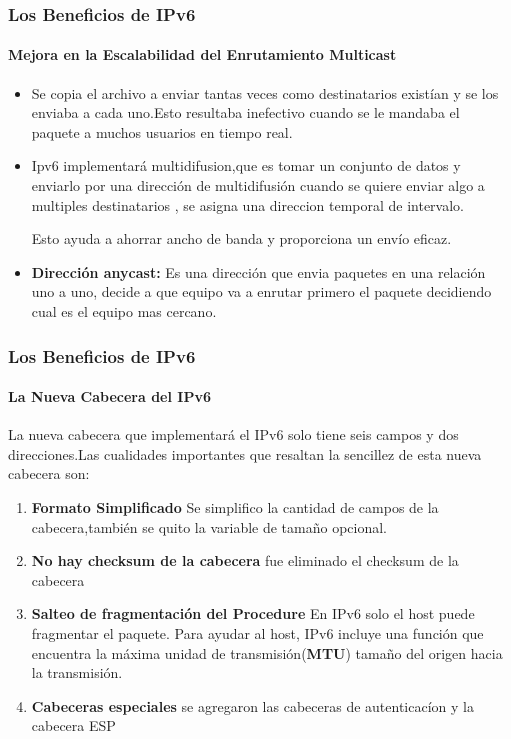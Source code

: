 \documentclass{beamer}
\begin{document}
\begin{frame}
\frametitle{Los Beneficios de IPv6}
\framesubtitle{Mejora en la Escalabilidad del Enrutamiento Multicast}
\begin{itemize}
\item Se copia  el archivo a enviar tantas 
veces como destinatarios existían y se los enviaba a cada uno.Esto resultaba inefectivo cuando se le mandaba el paquete a muchos usuarios en tiempo real.\par
\item Ipv6 implementará multidifusion,que es tomar  un conjunto de datos y enviarlo por una dirección de multidifusión
cuando se quiere enviar algo a multiples destinatarios , se asigna una direccion temporal de intervalo.\par
Esto ayuda a ahorrar ancho de banda y proporciona un envío eficaz.
\item  \textbf{Dirección anycast:} Es una dirección que envia paquetes en una relación uno a uno, decide a que equipo va a enrutar primero el paquete decidiendo cual es el equipo mas cercano.
 \end{itemize}
\end{frame}


\begin{frame}
\frametitle{Los Beneficios de IPv6}
\framesubtitle{La Nueva Cabecera del IPv6}
La nueva cabecera que implementará el IPv6 solo tiene seis campos y dos direcciones.Las cualidades importantes que resaltan la sencillez de esta nueva cabecera son:
 \begin{enumerate}
\item \textbf{Formato Simplificado} Se simplifico la cantidad de campos de la cabecera,también se quito la 
variable de tamaño opcional.
\item \textbf{No hay checksum de la cabecera} fue eliminado el checksum de la cabecera
\item \textbf{Salteo de fragmentación del Procedure} En IPv6 solo el host puede fragmentar el paquete. Para ayudar al 
host, IPv6 incluye una función que encuentra la máxima unidad de transmisión(\textbf{MTU}) tamaño 
del origen hacia la transmisión.
\item \textbf{Cabeceras especiales} se agregaron las cabeceras de autenticacíon y la cabecera ESP

\end {enumerate}
\end{frame}

\end{document}
